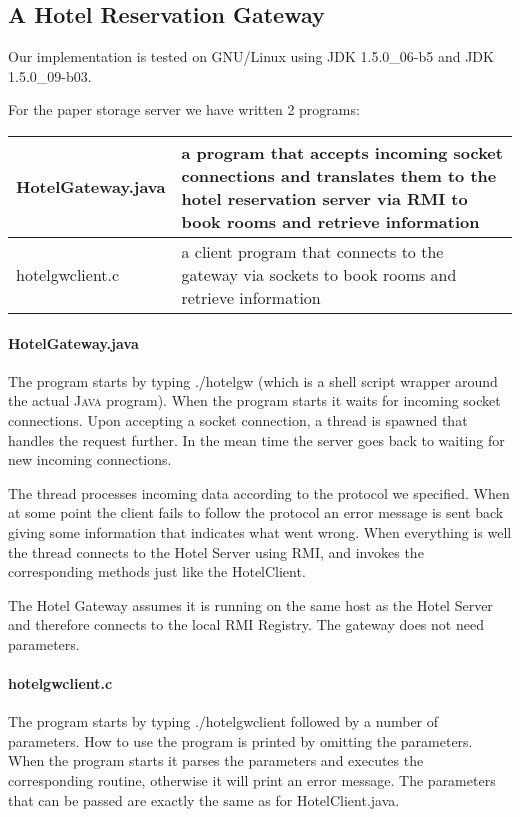 \documentclass[a4paper,10pt]{article}
\begin{document}
\subsection{A Hotel Reservation Gateway}\label{sec:gateway}

Our implementation is tested on GNU/Linux using JDK 1.5.0\_06-b5 and JDK 1.5.0\_09-b03.

For the paper storage server we have written 2 programs:
\begin{center}
\begin{tabular}{ l | p{8.2cm} }
HotelGateway.java & a program that accepts incoming socket connections and translates them to the hotel reservation server via RMI to book rooms and retrieve information\\ \hline
hotelgwclient.c & a client program that connects to the gateway via sockets to book rooms and retrieve information\\
\end{tabular}
\end{center}

\paragraph{HotelGateway.java}
The program starts by typing ./hotelgw (which is a shell script wrapper around the actual \textsc{Java} program). When the program starts it waits for incoming socket connections. Upon accepting a socket connection, a thread is spawned that handles the request further. In the mean time the server goes back to waiting for new incoming connections.

The thread processes incoming data according to the protocol we specified. When at some point the client fails to follow the protocol an error message is sent back giving some information that indicates what went wrong. When everything is well the thread connects to the Hotel Server using RMI, and invokes the corresponding methods just like the HotelClient.

The Hotel Gateway assumes it is running on the same host as the Hotel Server and therefore connects to the local RMI Registry. The gateway does not need parameters.

\paragraph{hotelgwclient.c}
The program starts by typing ./hotelgwclient followed by a number of parameters. How to use the program is printed by omitting the parameters. When the program starts it parses the parameters and executes the corresponding routine, otherwise it will print an error message. The parameters that can be passed are exactly the same as for HotelClient.java.
\end{document}
